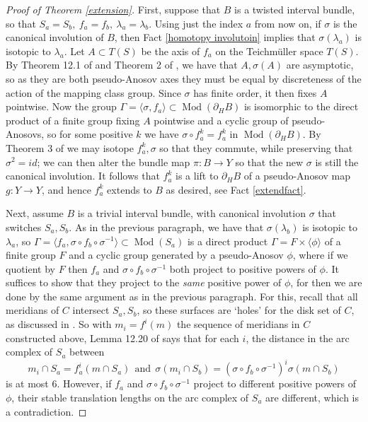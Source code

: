 \documentclass[12pt]{amsart}
\theoremstyle{definition}
\theoremstyle{remark}
\DeclareMathOperator{\Mod}{Mod}
\begin{document}
\begin{proof}[Proof of Theorem \ref{extension}]
 First, suppose that $B $ is a twisted interval bundle, so that $S_a=S_b, \ f_a=f_b, \ \lambda_a=\lambda_b$. Using just the index $a$ from now on, if $\sigma$ is the canonical involution of $B$, then Fact \ref{homotopy involutoin} implies that $\sigma(\lambda_a)$ is isotopic to $\lambda_a$. Let $A \subset T(S)$ be the axis of $f_a$ on the Teichm\"uller space $T(S)$. By Theorem 12.1 of \cite{Fathitravaux} and Theorem 2 of \cite{masur1980uniquely}, we have that $A,\sigma(A)$ are asymptotic, so as they are both pseudo-Anosov axes they must be equal by discreteness of the action of the mapping class group. Since $\sigma$ has finite order, it then fixes $A$ pointwise. Now the group $\Gamma= \langle \sigma,f_a\rangle \subset \Mod(\partial_HB)$ is isomorphic to the direct product of a finite group fixing $A$ pointwise and a cyclic group of pseudo-Anosovs, so for some positive $k$ we have $\sigma \circ f_a^k = f_a^k$ in $\Mod(\partial_H B)$. By Theorem 3 of \cite{birman1973isotopies} we may isotope $f_a^k,\sigma$ so that they commute, while preserving that $\sigma^2=id$; we can then alter the bundle map $\pi : B \longrightarrow Y$ so that the new $\sigma$ is still the canonical involution. It follows that $f_a^k $ is a lift to $\partial_HB$ of a pseudo-Anosov map $g: Y \longrightarrow Y$, and hence $f_a^k $ extends to $B$ as desired, see Fact \ref{extendfact}.


Next, assume $B$ is a trivial interval bundle, with canonical involution $\sigma$ that switches $S_a,S_b$. As in the previous paragraph, we have that $\sigma(\lambda_b)$ is isotopic to $\lambda_a$, so $\Gamma = \langle f_a, \sigma \circ f_b \circ \sigma^{-1}\rangle  \subset \Mod(S_a)$ is a direct product $\Gamma = F \times \langle \phi \rangle$ of a finite group $F$ and a cyclic group generated by a pseudo-Anosov $\phi$, where if we quotient by $F$ then $f_a$ and $ \sigma \circ f_b \circ \sigma^{-1}$ both project to positive powers of $\phi$. It suffices to show that they project to the \emph{same} positive power of $\phi$, for then we are done by the same argument as in the previous paragraph. For this, recall that all meridians of $C$ intersect $S_a,S_b$, so these surfaces are `holes' for the disk set of $C$, as discussed in \cite{masur2013geometry}. So with $m_i=f^i(m)$ the sequence of meridians in $C$ constructed above, Lemma 12.20 of \cite{masur2013geometry} says that for each $i$, the distance in the arc complex of $S_a$ between $$m_i \cap S_a = f_a^i(m \cap S_a) \ \ \text{and} \ \ \sigma(m_i\cap S_b) = (\sigma \circ f_b \circ \sigma^{-1})^i \sigma(m\cap S_b) $$ is at most 6. However, if $f_a$ and $ \sigma \circ f_b \circ \sigma^{-1}$ project to different positive powers of $\phi$, their stable translation lengths on the arc complex of $S_a$ are different, which is a contradiction.
\end{proof} 




 


\end{document}
